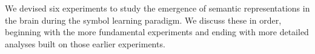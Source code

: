 \label{chapter:experiments}

We devised six experiments to study the emergence of semantic representations 
in the brain during the symbol learning paradigm. We discuss these in order, 
beginning with the more fundamental experiments and ending with more detailed 
analyses built on those earlier experiments.









